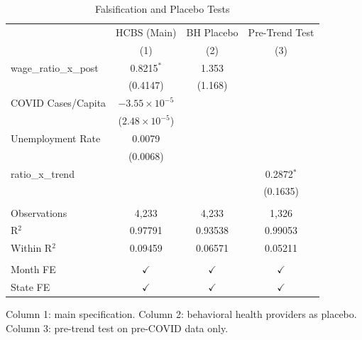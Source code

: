 
\begin{table}[htbp]
   \caption{\label{tab:placebo} Falsification and Placebo Tests}
   \bigskip
   \centering
   \begin{tabular}{lccc}
      \toprule
                              & HCBS (Main)             & BH Placebo    & Pre-Trend Test \\   
                              & (1)                     & (2)           & (3)\\  
      \midrule 
      wage\_ratio\_x\_post    & 0.8215$^{*}$            & 1.353         &   \\   
                              & (0.4147)                & (1.168)       &   \\   
      COVID Cases/Capita      & $-3.55\times 10^{-5}$   &               &   \\   
                              & ($2.48\times 10^{-5}$)  &               &   \\   
      Unemployment Rate       & 0.0079                  &               &   \\   
                              & (0.0068)                &               &   \\   
      ratio\_x\_trend         &                         &               & 0.2872$^{*}$\\   
                              &                         &               & (0.1635)\\   
       \\
      Observations            & 4,233                   & 4,233         & 1,326\\  
      R$^2$                   & 0.97791                 & 0.93538       & 0.99053\\  
      Within R$^2$            & 0.09459                 & 0.06571       & 0.05211\\  
       \\
      Month FE                & $\checkmark$            & $\checkmark$  & $\checkmark$\\   
      State FE                & $\checkmark$            & $\checkmark$  & $\checkmark$\\   
      \bottomrule
   \end{tabular}
   
   \par \raggedright 
   Column 1: main specification. Column 2: behavioral health providers as placebo. Column 3: pre-trend test on pre-COVID data only.
\end{table}


